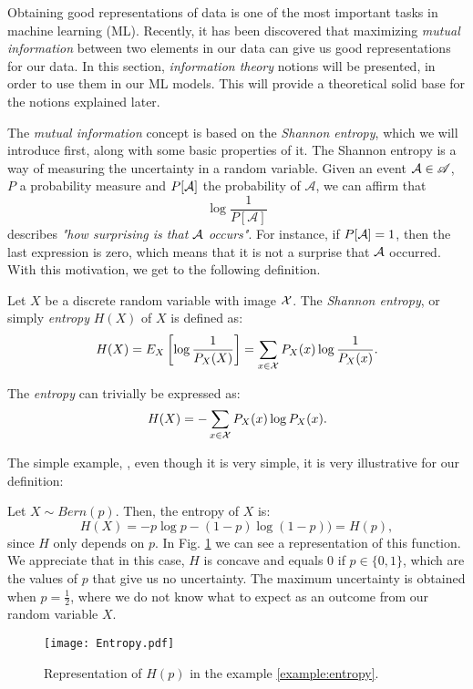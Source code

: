 Obtaining good representations of data is one of the most important tasks in machine learning (ML). 
Recently, it has been discovered that maximizing \emph{mutual information} between two elements in our data can give us good representations for our data.
In this section, \emph{information theory} notions will be presented, in order to use them in our ML models. This will provide a theoretical solid base for
the notions explained later.


The \emph{mutual information} concept is based on the \emph{Shannon entropy}, which we will introduce first, along with some basic properties of it. The Shannon entropy is a way of measuring the uncertainty in a random variable. 
Given an event $\mathcal A \in \mathscr{A}$, $P$ a probability measure and $P[\mathcal A]$ the probability of $\mathcal A$, we can affirm that 
$$
\log\frac{1}{P[\mathcal A]}
$$
describes \emph{"how surprising is that $\mathcal A$ occurs"}. For instance, if $P[\mathcal A] = 1$, then the last expression is zero, which means that it is not a surprise that $\mathcal A$ occurred. With this motivation, we get to the following definition.


\begin{ndef}
Let $X$ be a discrete random variable with image $\mathcal{X}$. The \emph{Shannon entropy}, or simply \emph{entropy}  $H(X)$ of $X$ is defined as:
$$
H(X) = E_X\left[\log\frac{1}{P_X(X)}\right] =  \sum_{x \in \mathcal{X}} P_X(x) \log\frac{1}{P_X(x)}.
$$
\end{ndef}
The \emph{entropy} can trivially be expressed as:
$$
H(X) = - \sum_{x \in \mathcal{X}}P_X (x)\log P_X(x).
$$

The simple example, \citep{cover_elements_1991}, even though it is very simple, it is very illustrative for our definition:

\begin{nexample}
    \label{example:entropy}
Let $X \sim Bern(p)$. Then, the entropy of $X$ is:
\[
H(X) = -p \log p - (1-p) \log(1-p)) = H(p),
\]
since $H$ only depends on $p$. In Fig. \ref{fig:example:entropy} we can see a representation of this function. We appreciate that in this case, $H$ is concave and equals $0$ if $p \in \{0,1\}$, which are the values of $p$ that give us no uncertainty. The maximum uncertainty is obtained when $p=\frac{1}{2}$, where we do not know what to expect as an outcome from our random variable $X$.

\begin{figure}[H]
    \label{fig:example:entropy}
    \centering
    \texttt{[image: Entropy.pdf]}

      \caption{Representation of $H(p)$ in the example \ref{example:entropy}.}
\end{figure}

\end{nexample}


